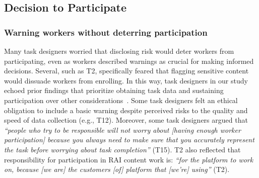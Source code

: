 \subsection{Decision to Participate}
\subsubsection{Warning workers without deterring participation}
Many task designers worried that disclosing risk would deter workers from participating, even as workers described warnings as crucial for making informed decisions. Several, such as T2, specifically feared that flagging sensitive content would dissuade workers from enrolling. In this way, task designers in our study echoed prior findings that prioritize obtaining task data and sustaining participation over other considerations~\cite{qian2025locating, finnerty2013keep, kittur2008crowdsourcing}. Some task designers felt an ethical obligation to include a basic warning despite perceived risks to the quality and speed of data collection (e.g., T12). Moreover, some task designers argued that \textit{``people who try to be responsible will not worry about [having enough worker participation] because you always need to make sure that you accurately represent the task before worrying about task completion''} (T15). T2 also reflected that responsibility for participation in RAI content work is: \textit{``for the platform to work on, because [we are] the customers [of] platform that [we're] using''} (T2). 

